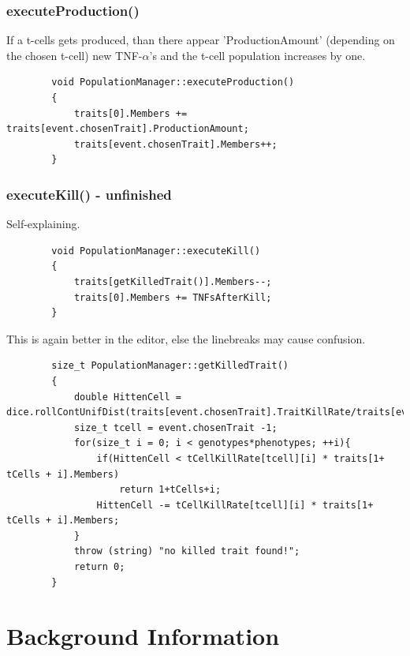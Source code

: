 \documentclass[a4paper,10pt]{scrartcl}
\begin{document}
		\subsubsection{executeProduction()}
		If a t-cells gets produced, than there appear 'ProductionAmount' (depending on the chosen t-cell) new TNF-$ \alpha $'s and the t-cell population increases by one.
		\begin{lstlisting}
		void PopulationManager::executeProduction()
		{
		    traits[0].Members += traits[event.chosenTrait].ProductionAmount;
		    traits[event.chosenTrait].Members++;
		}
		\end{lstlisting}
		
		\subsubsection{executeKill() - unfinished}
		Self-explaining.
		\begin{lstlisting}
		void PopulationManager::executeKill()
		{
		    traits[getKilledTrait()].Members--;
		    traits[0].Members += TNFsAfterKill;
		}
		\end{lstlisting}
		This is again better in the editor, else the linebreaks may cause confusion.
		\begin{lstlisting}
		size_t PopulationManager::getKilledTrait()
		{
		    double HittenCell = dice.rollContUnifDist(traits[event.chosenTrait].TraitKillRate/traits[event.chosenTrait].Members);
		    size_t tcell = event.chosenTrait -1;
		    for(size_t i = 0; i < genotypes*phenotypes; ++i){
		        if(HittenCell < tCellKillRate[tcell][i] * traits[1+ tCells + i].Members)
		            return 1+tCells+i;
		        HittenCell -= tCellKillRate[tcell][i] * traits[1+ tCells + i].Members;
		    }
		    throw (string) "no killed trait found!";
		    return 0;
		}
		\end{lstlisting}								

\section{Background Information}
\end{document}
